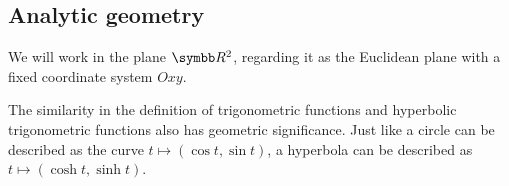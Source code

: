 \subsection{Analytic geometry}\label{subsec:analytic_geometry}

We will work in the plane \( \R^2 \), regarding it as the Euclidean plane with a fixed coordinate system \( Oxy \).

\begin{remark}\label{remark:hyperbolic_trigonometric_functions}
  The similarity in the definition of trigonometric functions and hyperbolic trigonometric functions also has geometric significance. Just like a circle can be described as the curve \( t \mapsto (\cos t, \sin t) \), a hyperbola can be described as \( t \mapsto (\cosh t, \sinh t) \).
\end{remark}
